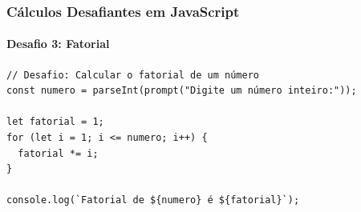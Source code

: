 \documentclass[13pt, xcolor={dvipsnames,svgnames}, portuguese]{beamer}
\begin{document}
\begin{frame}[fragile]
\frametitle{Cálculos Desafiantes em JavaScript}
\framesubtitle{Desafio 3: Fatorial}

\begin{verbatim}
// Desafio: Calcular o fatorial de um número
const numero = parseInt(prompt("Digite um número inteiro:"));

let fatorial = 1;
for (let i = 1; i <= numero; i++) {
  fatorial *= i;
}

console.log(`Fatorial de ${numero} é ${fatorial}`);
\end{verbatim}

\end{frame}
















\end{document}
